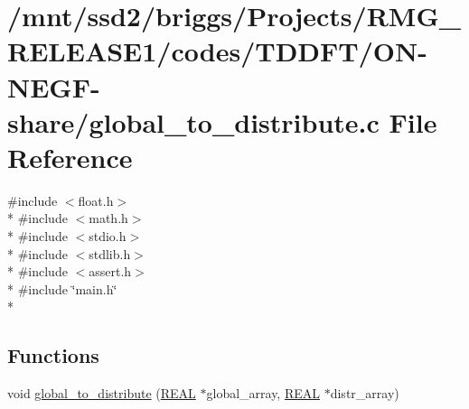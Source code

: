\hypertarget{_t_d_d_f_t_2_o_n-_n_e_g_f-share_2global__to__distribute_8c}{\section{/mnt/ssd2/briggs/\-Projects/\-R\-M\-G\-\_\-\-R\-E\-L\-E\-A\-S\-E1/codes/\-T\-D\-D\-F\-T/\-O\-N-\/\-N\-E\-G\-F-\/share/global\-\_\-to\-\_\-distribute.c File Reference}
\label{_t_d_d_f_t_2_o_n-_n_e_g_f-share_2global__to__distribute_8c}
}
{\ttfamily \#include $<$float.\-h$>$}\\*
{\ttfamily \#include $<$math.\-h$>$}\\*
{\ttfamily \#include $<$stdio.\-h$>$}\\*
{\ttfamily \#include $<$stdlib.\-h$>$}\\*
{\ttfamily \#include $<$assert.\-h$>$}\\*
{\ttfamily \#include \char`\"{}main.\-h\char`\"{}}\\*
\subsection*{Functions}
\begin{DoxyCompactItemize}
\item 
void \hyperlink{_t_d_d_f_t_2_o_n-_n_e_g_f-share_2global__to__distribute_8c_a7f1a145b4f7ec7c2dc0a983357f861ef}{global\-\_\-to\-\_\-distribute} (\hyperlink{md_8h_a4b654506f18b8bfd61ad2a29a7e38c25}{R\-E\-A\-L} $\ast$global\-\_\-array, \hyperlink{md_8h_a4b654506f18b8bfd61ad2a29a7e38c25}{R\-E\-A\-L} $\ast$distr\-\_\-array)
\end{DoxyCompactItemize}


